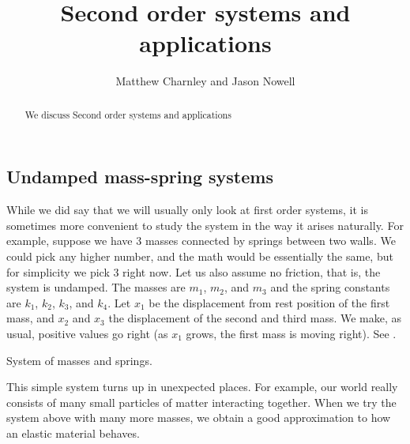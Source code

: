 \documentclass{ximera}
\title{Second order systems and applications}
\author{Matthew Charnley and Jason Nowell}
\begin{document}
\begin{abstract}
    We discuss Second order systems and applications
\end{abstract}
\maketitle


\label{sol:section}

\subsection{Undamped mass-spring systems}

While we did say that we will usually only look at first order systems, it is sometimes more convenient to study the system in the way it arises naturally. For example, suppose we have 3 masses connected by springs between two walls.  We could pick any higher number, and the math would be essentially the same, but for simplicity we pick 3 right now.  Let us also assume no friction, that is, the system is undamped. The masses are $m_1$, $m_2$, and $m_3$ and the spring constants are $k_1$, $k_2$, $k_3$, and $k_4$. Let $x_1$ be the displacement from rest position of the first mass, and $x_2$ and $x_3$ the displacement of the second and third mass.  We make, as usual, positive values go right (as $x_1$ grows, the first mass is moving right). See .

\begin{myfig}
    \capstart
    
    \caption{System of masses and springs.\label{sosa:threecartsfig}}
\end{myfig}

This simple system turns up in unexpected places.  For example, our world really consists of many small particles of matter interacting together. When we try the system above with many more masses, we obtain a good approximation to
how an elastic material behaves. %
\end{document}
